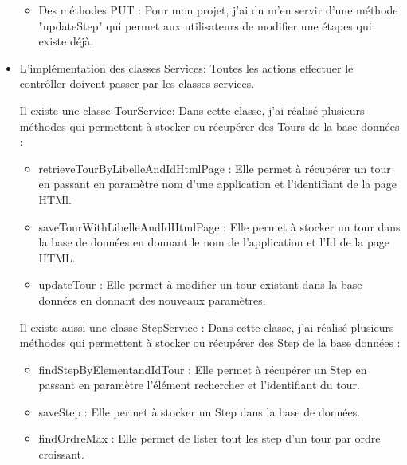 \documentclass[12pt]{article}
\begin{document}
\begin{itemize}
\begin{itemize}
\item Des méthodes PUT : Pour mon projet, j'ai du m’en servir  d'une méthode "updateStep" qui permet aux utilisateurs de modifier une étapes qui existe déjà.

\end{itemize}
\item L'implémentation des classes Services: Toutes les actions effectuer le contrôller doivent passer par les classes services.

Il existe une classe TourService: Dans cette classe, j'ai réalisé plusieurs méthodes qui permettent à stocker ou récupérer des Tours de la base données :
\begin{itemize}
\item  retrieveTourByLibelleAndIdHtmlPage : Elle permet à récupérer un tour en passant en paramètre nom d'une application et l'identifiant de la page HTMl.

\item saveTourWithLibelleAndIdHtmlPage : Elle permet à stocker un tour dans la base de données en donnant le nom de l'application et l'Id de la page HTML.

\item updateTour : Elle permet à modifier un tour existant dans la base données en donnant des nouveaux paramètres.
\end{itemize}

Il existe aussi une classe StepService : Dans cette classe, j'ai réalisé plusieurs méthodes qui permettent à stocker ou récupérer des Step de la base données :
\begin{itemize}

\item  findStepByElementandIdTour : Elle permet à récupérer un Step en passant en paramètre l'élément rechercher et l'identifiant du tour.

\item saveStep : Elle permet à stocker un Step dans la base de données.

\item findOrdreMax : Elle permet de lister tout les step d'un tour par ordre croissant.
\end{itemize}



\end{itemize}
\end{document}
